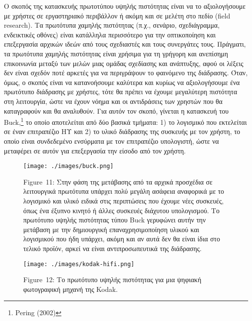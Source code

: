 \documentclass[
]{article}
\begin{document}
Ο σκοπός της κατασκευής πρωτοτύπου υψηλής πιστότητας είναι να το
αξιολογήσουμε με χρήστες σε εργαστηριακό περιβάλλον ή ακόμη και σε
μελέτη στο πεδίο (field research). Τα πρωτότυπα χαμηλής πιστότητας
(π.χ., σενάριο, σχεδιάγραμμα, ενδεικτικές οθόνες) είναι κατάλληλα
περισσότερο για την οπτικοποίηση και επεξεργασία αρχικών ιδεών από τους
σχεδιαστές και τους συνεργάτες τους. Πράγματι, τα πρωτότυπα χαμηλής
πιστότητας είναι χρήσιμα για τη γρήγορη και ανεπίσημη επικοινωνία μεταξύ
των μελών μιας ομάδας σχεδίασης και ανάπτυξης, αφού οι λέξεις δεν είναι
σχεδόν ποτέ αρκετές για να περιγράψουν το φαινόμενο της διάδρασης. Όταν,
όμως, ο σκοπός είναι να κατανοήσουμε καλύτερα και κυρίως να
αξιολογήσουμε ένα πρωτότυπο διάδρασης με χρήστες, τότε θα πρέπει να
έχουμε μεγαλύτερη πιστότητα στη λειτουργία, ώστε να έχουν νόημα και οι
αντιδράσεις των χρηστών που θα καταγραφούν και θα αναλυθούν. Για αυτόν
τον σκοπό, γίνεται η κατασκευή του Buck,\footnote{Pering (2002)} το
οποίο αποτελείται από δύο βασικά τμήματα: 1) το λογισμικό που εκτελείται
σε έναν επιτραπέζιο ΗΥ και 2) το υλικό διάδρασης της συσκευής με τον
χρήστη, το οποίο είναι συνδεδεμένο ενσύρματα με τον επιτραπέζιο
υπολογιστή, ώστε να μεταφέρει σε αυτόν για επεξεργασία την είσοδο από
τον χρήστη.

\leavevmode{}%
\begin{figure}
\hypertarget{fig:buck}{%
\centering
\texttt{[image: ./images/buck.png]}
\caption{Figure~11: Στην φάση της μετάβασης από τα αρχικά προσχέδια σε
λειτουργικά πρωτότυπα υπάρχει πολύ μεγάλη ασάφεια αναφορικά με το
λογισμικό και υλικό ειδικά στις περιπτώσεις που έχουμε νέες συσκευές,
όπως ένα έξυπνο κινητό ή άλλες συσκευές διάχυτου υπολογισμού. Το
πρωτότυπο υψηλής πιστότητας τύπου Buck γερυφώνει αυτήν την μετάβαση με
την δημιουργική επαναχρησιμοποίηση υλικού και λογισμικού που ήδη
υπάρχει, ακόμη και αν αυτά δεν θα είναι ίδια στο τελικό προϊόν, αρκεί να
είναι αντιπροσωπευτικά της διάδρασης.}\label{fig:buck}
}
\end{figure}

\leavevmode{}%
\begin{figure}
\hypertarget{fig:kodak-hifi}{%
\centering
\texttt{[image: ./images/kodak-hifi.png]}
\caption{Figure~12: Το πρωτότυπο υψηλής πιστότητας για μια ψηφιακή
φωτογραφική μηχανή της Kodak.}\label{fig:kodak-hifi}
}
\end{figure}
\end{document}
